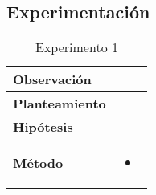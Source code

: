 \subsection{Experimentación}


\begin{table}[H]
    \centering
    \begin{tabularx}{\textwidth}{|p{4cm}|X|} %
        \hline %
        \textbf{Observación} &  
        \\ \hline 
        \textbf{Planteamiento} & 
        \\ \hline 
        \textbf{Hipótesis} & 
        \\ \hline 
        \textbf{Método} & 
        \begin{itemize}
            \item 
        \end{itemize}
        \\ \hline
    \end{tabularx}
    \caption{Experimento 1}
    \label{tab:tabla1}
\end{table}